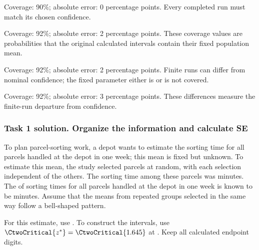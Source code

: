 \begin{answeroptions}
\item Coverage: 90\%; absolute error: 0 percentage points. Every completed run must match its chosen confidence.
\item Coverage: 92\%; absolute error: 2 percentage points. These coverage values are probabilities that the original calculated intervals contain their fixed population mean.
\item Coverage: 92\%; absolute error: 2 percentage points. Finite runs can differ from nominal confidence; the fixed parameter either is or is not covered.
\item Coverage: 92\%; absolute error: 3 percentage points. These differences measure the finite-run departure from confidence.
\end{answeroptions}
\clearpage
\subsubsection*{Task 1 solution. Organize the information and calculate SE}
\label{sol:c2-advanced-c-a}
To plan parcel-sorting work, a depot wants to estimate the  sorting time for all parcels handled at the depot in one week; this mean is fixed but unknown. To estimate this mean, the study selected  parcels at random, with each selection independent of the others. The  sorting time among these  parcels was  minutes. The  of sorting times for all parcels handled at the depot in one week is known to be  minutes. Assume that the means from repeated groups selected in the same way follow a bell-shaped pattern.

For this estimate, use  . To construct the intervals, use $\CtwoCritical{z^*}=\CtwoCritical{1.645}$ at . Keep all calculated endpoint digits.

